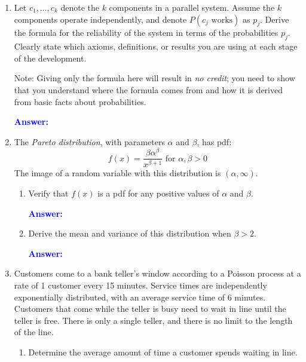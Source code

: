 \documentclass[12pt]{article}
\newcommand{\ansfont}[1]{{\textcolor{blue}{\textbf{Answer:}}\ \ #1}}
\begin{document}
\begin{enumerate}
\newpage %
\item Let $c_1, \ldots, c_k$ denote the $k$ components in a parallel system. Assume the $k$ components operate independently, and denote $P(c_j \text{ works})$ as $p_j$. Derive the formula for the reliability of the system in terms of the probabilities $p_j$. Clearly state which axioms, definitions, or results you are using at each stage of the development.

Note: Giving only the formula here will result in \emph{no credit}; you need to show that you understand where the formula comes from and how it is derived from basic facts about probabilities.



\ansfont{
}
\vfill





\newpage %
\item The \emph{Pareto distribution}, with parameters $\alpha$ and $\beta$, has pdf:
\[ f(x) = \frac{\beta \alpha^{\beta}}{x^{\beta + 1}} \text{ for } \alpha, \beta > 0 \]
The image of a random variable with this distribution is $(\alpha, \infty)$.
\begin{enumerate}
\item Verify that $f(x)$ is a pdf for any positive values of $\alpha$ and $\beta$.



\ansfont{
}
\vfill

\item Derive the mean and variance of this distribution when $\beta > 2$.



\ansfont{
}
\vfill
\end{enumerate}





\newpage %
\item Customers come to a bank teller's window according to a Poisson process at a rate of 1 customer every 15 minutes. Service times are independently exponentially distributed, with an average service time of 6 minutes. Customers that come while the teller is busy need to wait in line until the teller is free. There is only a single teller, and there is no limit to the length of the line.
\begin{enumerate}
\item Determine the average amount of time a customer spends waiting in line.




\end{enumerate}
\end{enumerate}
\end{document}
